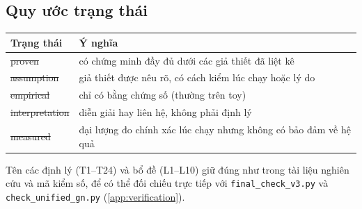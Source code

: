 \subsection{Quy ước trạng thái}

\begin{tabularx}{\linewidth}{@{}lX@{}}
\toprule
Trạng thái & Ý nghĩa \\
\midrule
\st{proven} & có chứng minh đầy đủ dưới các giả thiết đã liệt kê \\
\st{assumption} & giả thiết được nêu rõ, có cách kiểm lúc chạy hoặc lý do \\
\st{empirical} & chỉ có bằng chứng số (thường trên toy) \\
\st{interpretation} & diễn giải hay liên hệ, không phải định lý \\
\st{measured} & đại lượng đo chính xác lúc chạy nhưng không có bảo đảm về hệ quả \\
\bottomrule
\end{tabularx}

\medskip
Tên các định lý (T1--T24) và bổ đề (L1--L10) giữ đúng như trong tài liệu nghiên cứu và mã kiểm số, để có thể đối chiếu trực tiếp với \texttt{final\_check\_v3.py} và \texttt{check\_unified\_gn.py} (\cref{app:verification}).
